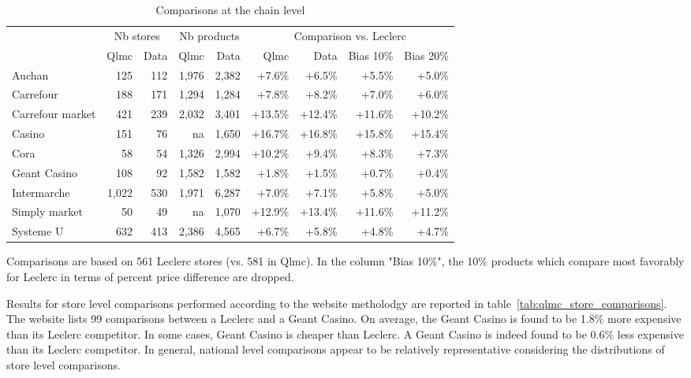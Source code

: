 \documentclass[english]{article}
\begin{document}
\begin{table}[H]
\caption{Comparisons at the chain level}
\label{tab:qlmc_chain_comparisons}
\begin{threeparttable}
\renewcommand{\arraystretch}{0.7}%
\small
\begin{tabular}{lrr|rr|rrrr}
\toprule
\toprule
          & \multicolumn{2}{c|}{Nb stores} &  \multicolumn{2}{c|}{Nb products} & \multicolumn{4}{c}{Comparison vs. Leclerc} \\
           & Qlmc  & Data  & Qlmc  & Data  & Qlmc  & Data  & Bias 10\% & Bias 20\% \\
\midrule
    Auchan & 125   & 112   & 1,976 & 2,382 & +7.6\% & +6.5\% & +5.5\% & +5.0\% \\
    Carrefour & 188   & 171   & 1,294 & 1,284 & +7.8\% & +8.2\% & +7.0\% & +6.0\% \\
    Carrefour market & 421   & 239   & 2,032 & 3,401 & +13.5\% & +12.4\% & +11.6\% & +10.2\% \\
    Casino & 151   & 76    & na    & 1,650 & +16.7\% & +16.8\% & +15.8\% & +15.4\% \\
    Cora  & 58    & 54    & 1,326 & 2,994 & +10.2\% & +9.4\% & +8.3\% & +7.3\% \\
    Geant Casino & 108   & 92    & 1,582 & 1,582 & +1.8\% & +1.5\% & +0.7\% & +0.4\% \\
    Intermarche & 1,022 & 530   & 1,971 & 6,287 & +7.0\% & +7.1\% & +5.8\% & +5.0\% \\
    Simply market & 50    & 49    & na    & 1,070 & +12.9\% & +13.4\% & +11.6\% & +11.2\% \\
    Systeme U & 632   & 413   & 2,386 & 4,565 & +6.7\% & +5.8\% & +4.8\% & +4.7\% \\
\bottomrule
\bottomrule
\end{tabular}
\begin{tablenotes}
      \small
      \item Comparisons are based on 561 Leclerc stores (vs. 581 in Qlmc). In the column "Bias 10\%", the 10\% products which compare most favorably for Leclerc in terms of percent price difference are dropped.
\end{tablenotes}
\end{threeparttable}
\end{table}

Results for store level comparisons performed according to the website metholodgy are reported in table~\ref{tab:qlmc_store_comparisons}. The website lists 99 comparisons between a Leclerc and a Geant Casino. On average, the Geant Casino is found to be 1.8\% more expensive than its Leclerc competitor.  In some cases, Geant Casino is cheaper than Leclerc. A Geant Casino is indeed found to be 0.6\% less expensive than its Leclerc competitor. In general, national level comparisons appear to be relatively representative considering the distributions of store level comparisons.
\end{document}
